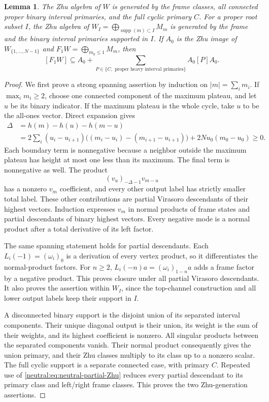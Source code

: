 \documentclass[11pt,a4paper]{article}
\numberwithin{equation}{section}
\newtheorem{lemma}[theorem]{Lemma}
\theoremstyle{definition}\newtheorem{definition}[theorem]{Definition}
\theoremstyle{remark}\newtheorem{remark}[theorem]{Remark}
\begin{document}
\begin{lemma}\label{neutral:lem:binary-Zhu-generation}
The Zhu algebra of $W$ is generated by the frame classes, all
connected proper binary interval primaries, and the full cyclic
primary $C$.  For a proper root subset $I$, the Zhu algebra of
$W_I=\bigoplus_{\operatorname{supp}(m)\subset I}M_m$ is generated by
the frame and the binary interval primaries supported in $I$.
If $A_0$ is the Zhu image of $W_{\{1,\ldots,N-1\}}$ and
$F_1W=\bigoplus_{m_0\leq1}M_m$, then
\[
 [F_1W]\subseteq A_0+
 \sum_{P\in\{C,\text{ proper heavy interval primaries}\}}A_0[P]A_0.
\]
\end{lemma}

\begin{proof}
We first prove a strong spanning assertion by induction on
$|m|=\sum_i m_i$.  If $\max_i m_i\geq2$, choose one connected
component of the maximum plateau, and let $u$ be its binary
indicator.  If the maximum plateau is the whole cycle, take $u$
to be the all-ones vector.  Direct expansion gives
\begin{align*}
 \Delta&=h(m)-h(u)-h(m-u)\\
 &=2\sum_i(u_i-u_{i+1})
       \bigl((m_i-u_i)-(m_{i+1}-u_{i+1})\bigr)
                                  +2Nu_0(m_0-u_0)\geq0.
\end{align*}
Each boundary term is nonnegative because a neighbor outside the
maximum plateau has height at most one less than its maximum.
The final term is nonnegative as well.
The product
\[
                       (v_u)_{-\Delta-1}v_{m-u}
\]
has a nonzero $v_m$ coefficient, and every other output label has
strictly smaller total label.  These other contributions are partial
Virasoro descendants of their highest vectors.  Induction expresses
$v_m$ in normal products of frame states and partial descendants of
binary highest vectors.  Every negative mode is a normal product
after a total derivative of its left factor.

The same spanning statement holds for partial descendants.  Each
$L_i(-1)=(\omega_i)_0$ is a derivation of every vertex product, so
it differentiates the normal-product factors.  For $n\geq2$,
$L_i(-n)a=(\omega_i)_{1-n}a$ adds a frame factor by a negative
product.  This proves closure under all partial Virasoro descendants.
It also proves the assertion within $W_I$, since the top-channel
construction and all lower output labels keep their support in $I$.

A disconnected binary support is the disjoint union of its separated
interval components.  Their unique diagonal output is their union,
its weight is the sum of their weights, and its highest coefficient
is nonzero.  All singular products between the separated components
vanish.  Their normal product consequently gives the union primary,
and their Zhu classes multiply to its class up to a nonzero scalar.
The full cyclic support is a separate connected case, with primary
$C$.  Repeated use of \eqref{neutral:eq:neutral-partial-Zhu} reduces
every partial descendant to its primary class and left/right frame
classes.  This proves the two Zhu-generation assertions.


\end{proof}
\end{document}
